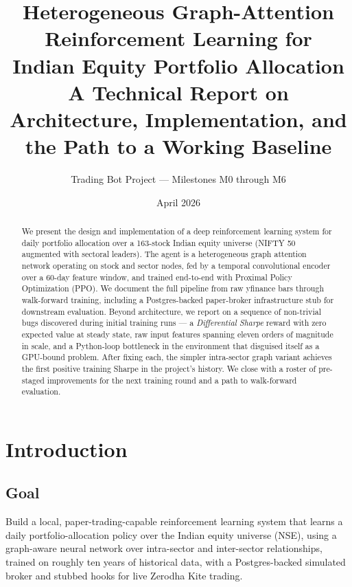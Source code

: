 \documentclass[11pt,a4paper]{article}
\title{
  \vspace{-1cm}
  \Large\textbf{Heterogeneous Graph-Attention Reinforcement Learning for \\
  Indian Equity Portfolio Allocation} \\[0.3em]
  \large A Technical Report on Architecture, Implementation, and the Path to a Working Baseline
}
\author{Trading Bot Project --- Milestones M0 through M6}
\date{April 2026}
\begin{document}
\maketitle
\thispagestyle{empty}

\begin{abstract}
\noindent We present the design and implementation of a deep reinforcement learning system
for daily portfolio allocation over a 163-stock Indian equity universe (NIFTY 50 augmented with
sectoral leaders). The agent is a heterogeneous graph attention network operating on stock and
sector nodes, fed by a temporal convolutional encoder over a 60-day feature window, and trained
end-to-end with Proximal Policy Optimization (PPO). We document the full pipeline from raw
yfinance bars through walk-forward training, including a Postgres-backed paper-broker
infrastructure stub for downstream evaluation. Beyond architecture, we report on a sequence of
non-trivial bugs discovered during initial training runs --- a \emph{Differential Sharpe} reward
with zero expected value at steady state, raw input features spanning eleven orders of magnitude
in scale, and a Python-loop bottleneck in the environment that disguised itself as a GPU-bound
problem. After fixing each, the simpler intra-sector graph variant achieves the first positive
training Sharpe in the project's history. We close with a roster of pre-staged improvements for
the next training round and a path to walk-forward evaluation.
\end{abstract}

\tableofcontents
\newpage

\section{Introduction}

\subsection{Goal}

Build a local, paper-trading-capable reinforcement learning system that learns a daily
portfolio-allocation policy over the Indian equity universe (NSE), using a graph-aware
neural network over intra-sector and inter-sector relationships, trained on roughly ten
years of historical data, with a Postgres-backed simulated broker and stubbed hooks for
live Zerodha Kite trading.
\end{document}
